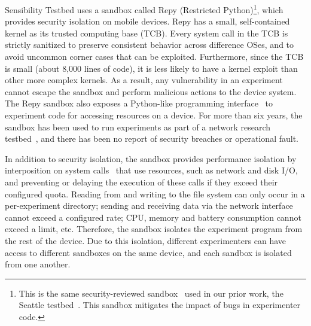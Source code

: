 Sensibility Testbed uses a sandbox called Repy (Restricted 
Python)\footnote{\scriptsize This is the 
same security-reviewed sandbox~\cite{cappos2010retaining} used in
our prior work, the Seattle testbed~\cite{seattle}. This sandbox
mitigates the impact of bugs in experimenter code.}, which 
provides security isolation on mobile devices.
Repy has a small, self-contained kernel as its trusted 
computing base (TCB). %
Every system call in the TCB is strictly 
sanitized to preserve consistent behavior across difference OSes, 
and to avoid uncommon corner cases that can be exploited. 
Furthermore, since the TCB is small (about 8,000 lines of code), it is 
less likely to have a kernel exploit than other more complex kernels. 
As a result, any vulnerability in an experiment 
cannot escape the sandbox and perform malicious actions to 
the device system. The Repy sandbox also exposes a Python-like 
programming interface~\cite{repyv2} to experiment code 
for accessing resources on a device. 
For more than six years, the
sandbox has been used to run experiments as part of a network research 
testbed~\cite{seattle}, and there has been no report of security 
breaches or operational fault. 

In addition to security isolation,
the sandbox provides performance isolation by
interposition on system calls~\cite{garfinkel2003traps} that 
use resources, such as network and disk I/O, and preventing 
or delaying the execution of these calls if they exceed 
their configured quota. 
Reading from and writing to the file system can
only occur in a per-experiment directory; sending and receiving
data via the network interface cannot exceed a configured rate;
CPU, memory and battery consumption cannot exceed a limit, etc.
Therefore, the sandbox isolates the experiment program from 
the rest of the device. Due to this isolation, different experimenters
can have access to different sandboxes on the same device,
and each sandbox is isolated from one another.

